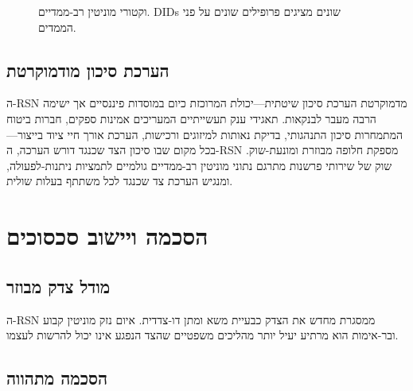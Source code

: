 \documentclass[11pt,a4paper,twocolumn]{article}
\begin{document}
\begin{figure}[ht]
\centering
{}
\caption{וקטורי מוניטין רב-ממדיים. DIDs שונים מציגים פרופילים שונים על פני הממדים.}
\label{fig:reputation-radar}
\end{figure}

\subsection{הערכת סיכון מודמוקרטת}

ה-RSN מדמוקרטת הערכת סיכון שיטתית---יכולת המרוכזת כיום במוסדות פיננסיים אך ישימה הרבה מעבר לבנקאות. תאגידי ענק תעשייתיים המעריכים אמינות ספקים, חברות ביטוח המתמחרות סיכון התנהגותי, בדיקת נאותות למיזוגים ורכישות, הערכת אורך חיי ציוד בייצור---בכל מקום שבו סיכון הצד שכנגד דורש הערכה, ה-RSN מספקת חלופה מבוזרת ומונעת-שוק. שוק של שירותי פרשנות מתרגם נתוני מוניטין רב-ממדיים גולמיים לתמציות ניתנות-לפעולה, ומנגיש הערכת צד שכנגד לכל משתתף בעלות שולית.

\section{הסכמה ויישוב סכסוכים}

\subsection{מודל צדק מבוזר}

ה-RSN ממסגרת מחדש את הצדק כבעיית משא ומתן דו-צדדית. איום נזק מוניטין קבוע ובר-אימות הוא מרתיע יעיל יותר מהליכים משפטיים שהצד הנפגע אינו יכול להרשות לעצמו.

\subsection{הסכמה מתהווה}
\end{document}
